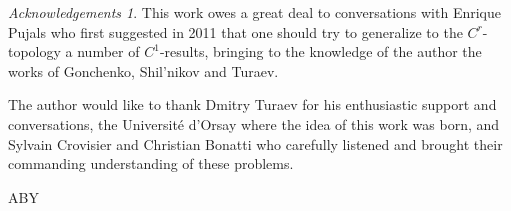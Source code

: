 \documentclass[11pt, a4paper]{amsart}
\theoremstyle{plain}
\theoremstyle{definition}
\theoremstyle{remark}
\newtheorem*{ack}{Acknowledgements}    %
\numberwithin{equation}{section}         %
\begin{document}
\begin{ack}
This work owes a great deal to conversations with Enrique Pujals who first suggested in 2011 that one should try to generalize to the $C^r$-topology a number of $C^1$-results, bringing to the knowledge of the author the works of Gonchenko, Shil'nikov and Turaev. 

The author would like to thank Dmitry Turaev for his enthusiastic support and conversations, the Universit\'e d'Orsay where the idea of this work was born, and Sylvain Crovisier and Christian Bonatti who carefully listened and brought their commanding understanding of these problems.
\end{ack}


\begin{thebibliography}{ABY}
















\end{thebibliography}
\end{document}
